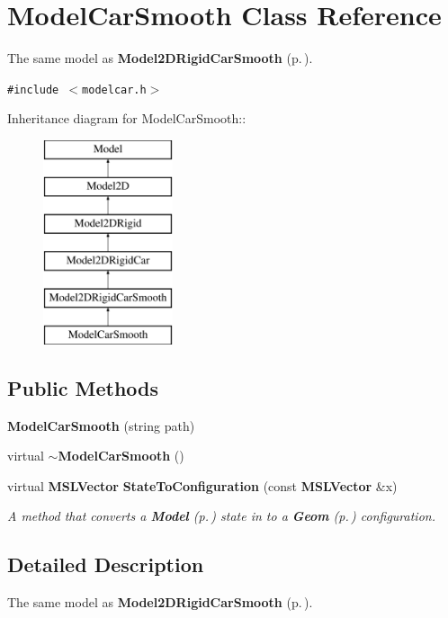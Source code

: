 \section{Model\-Car\-Smooth  Class Reference}
\label{classModelCarSmooth}
The same model as {\bf Model2DRigid\-Car\-Smooth} {\rm (p.\,\pageref{classModel2DRigidCarSmooth})}. 


{\tt \#include $<$modelcar.h$>$}

Inheritance diagram for Model\-Car\-Smooth::\begin{figure}[H]
\begin{center}
\leavevmode
\includegraphics[height=6cm]{classModelCarSmooth}
\end{center}
\end{figure}
\subsection*{Public Methods}
\begin{CompactItemize}
\item 
{\bf Model\-Car\-Smooth} (string path)
\item 
virtual {\bf $\sim$Model\-Car\-Smooth} ()
\item 
virtual {\bf MSLVector} {\bf State\-To\-Configuration} (const {\bf MSLVector} \&x)
\begin{CompactList}\small\item\em A method that converts a {\bf Model} {\rm (p.\,\pageref{classModel})} state in to a {\bf Geom} {\rm (p.\,\pageref{classGeom})} configuration.\item\end{CompactList}\end{CompactItemize}


\subsection{Detailed Description}
The same model as {\bf Model2DRigid\-Car\-Smooth} {\rm (p.\,\pageref{classModel2DRigidCarSmooth})}.



